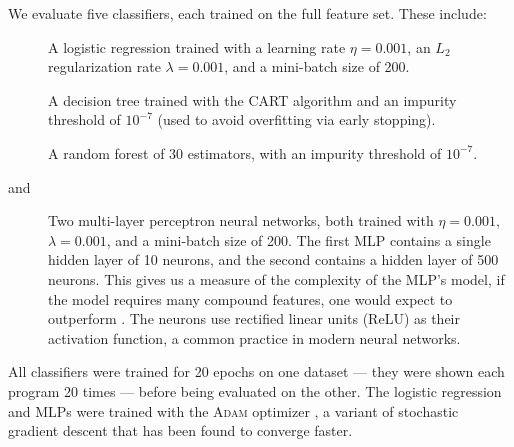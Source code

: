 We evaluate five classifiers, each trained on the full feature set.
%
%
These include:
%
\begin{description}
\item[\linear] A logistic regression trained with a learning rate
  $\eta = 0.001$, an $L_2$ regularization rate $\lambda = 0.001$, and a
  mini-batch size of 200.
\item[\dectree] A decision tree trained with the CART algorithm
  \citep{Breiman1984-qy} and an impurity threshold of $10^{-7}$ (used to
  avoid overfitting via early stopping).
\item[\forest] A random forest \citep{Breiman2001-wo} of 30
  estimators, with an impurity threshold of $10^{-7}$.
\item[\hiddenT and \hiddenFH] Two multi-layer perceptron neural
  networks, both trained with $\eta = 0.001$, $\lambda = 0.001$, and a
  mini-batch size of 200.
  The first MLP contains a single hidden layer of 10 neurons, and the
  second contains a hidden layer of 500 neurons.
  This gives us a measure of the complexity of the MLP's model, \ie
  if the model requires many compound features, one would expect \hiddenFH
  to outperform \hiddenT.
  The neurons use rectified linear units (ReLU) as their activation
  function, a common practice in modern neural networks.
\end{description}
%
All classifiers were trained for 20 epochs on one dataset
--- \ie they were shown each program 20 times ---
before being evaluated on the other.
%
The logistic regression and MLPs were trained with the \textsc{Adam}
optimizer \citep{Kingma2014-ng}, a variant of stochastic gradient
descent that has been found to converge faster.



